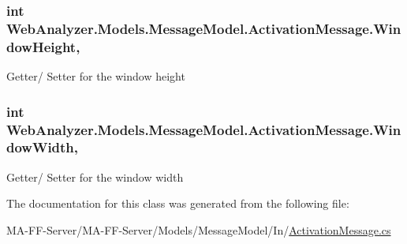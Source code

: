 \subsubsection[{Window\+Height}]{\setlength{\rightskip}{0pt plus 5cm}int Web\+Analyzer.\+Models.\+Message\+Model.\+Activation\+Message.\+Window\+Height\hspace{0.3cm}{\ttfamily [get]}, {\ttfamily [set]}}\label{class_web_analyzer_1_1_models_1_1_message_model_1_1_activation_message_aa7179d1f480e697fdd30d43b6919c076}


Getter/ Setter for the window height 

\hypertarget{class_web_analyzer_1_1_models_1_1_message_model_1_1_activation_message_adb9b326b9f17dd3dbe0ef8a645b7b38b}{}
\subsubsection[{Window\+Width}]{\setlength{\rightskip}{0pt plus 5cm}int Web\+Analyzer.\+Models.\+Message\+Model.\+Activation\+Message.\+Window\+Width\hspace{0.3cm}{\ttfamily [get]}, {\ttfamily [set]}}\label{class_web_analyzer_1_1_models_1_1_message_model_1_1_activation_message_adb9b326b9f17dd3dbe0ef8a645b7b38b}


Getter/ Setter for the window width 



The documentation for this class was generated from the following file\+:\begin{DoxyCompactItemize}
\item 
M\+A-\/\+F\+F-\/\+Server/\+M\+A-\/\+F\+F-\/\+Server/\+Models/\+Message\+Model/\+In/\hyperlink{_activation_message_8cs}{Activation\+Message.\+cs}\end{DoxyCompactItemize}
